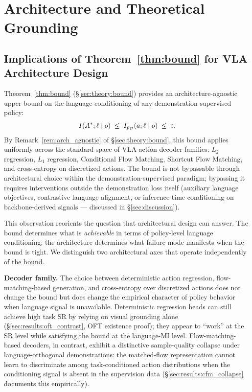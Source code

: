 
\section{Architecture and Theoretical Grounding}
\label{sec:architecture}

\subsection{Implications of Theorem~\ref{thm:bound} for VLA Architecture Design}
\label{sec:architecture:implications}

Theorem~\ref{thm:bound} (\S\ref{sec:theory:bound}) provides an architecture-agnostic upper
bound on the language conditioning of any demonstration-supervised policy:
\begin{equation}
I(A^{*}; \ell \mid o) \;\le\; I_{p_{\mathcal{D}}}(a; \ell \mid o) \;\le\; \varepsilon.
\label{eq:bound_in_arch}
\end{equation}
By Remark~\ref{rem:arch_agnostic} of \S\ref{sec:theory:bound}, this bound applies uniformly
across the standard space of VLA action-decoder families: $L_2$ regression, $L_1$
regression, Conditional Flow Matching, Shortcut Flow Matching, and cross-entropy on
discretized actions. The bound is not bypassable through architectural choice within the
demonstration-supervised paradigm; bypassing it requires interventions outside the
demonstration loss itself (auxiliary language objectives, contrastive language alignment,
or inference-time conditioning on backbone-derived signals --- discussed in
\S\ref{sec:discussion}).

This observation reorients the question that architectural design can answer. The bound
determines what is \emph{achievable} in terms of policy-level language conditioning; the
architecture determines what failure mode manifests when the bound is tight. We distinguish
two architectural axes that operate independently of the bound.

\textbf{Decoder family.} The choice between deterministic action regression,
flow-matching-based generation, and cross-entropy over discretized actions does not change
the bound but does change the empirical character of policy behavior when language signal
is unavailable. Deterministic regression heads can still achieve high task SR by relying on
visual grounding alone (\S\ref{sec:results:oft_contrast}, OFT existence proof); they appear
to ``work'' at the SR level while satisfying the bound at the language-MI level.
Flow-matching-based decoders, in contrast, exhibit a distinctive sample-quality collapse
under language-orthogonal demonstrations: the matched-flow representation cannot learn to
discriminate among task-conditioned action distributions when the conditioning signal is
absent in the supervision data (\S\ref{sec:results:cfm_collapse} documents this empirically).

